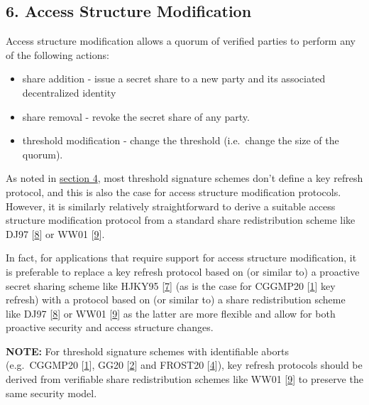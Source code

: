 \documentclass[
]{article}
\providecommand{\tightlist}{%
  \setlength{\itemsep}{0pt}\setlength{\parskip}{0pt}}
\begin{document}
\hypertarget{access-structure-modification}{%
\subsection{6. Access Structure
Modification}\label{access-structure-modification}}

Access structure modification allows a quorum of verified parties to
perform any of the following actions:

\begin{itemize}
\tightlist
\item
  share addition - issue a secret share to a new party and its
  associated decentralized identity
\item
  share removal - revoke the secret share of any party.
\item
  threshold modification - change the threshold (i.e.~change the size of
  the quorum).
\end{itemize}

As noted in \protect\hyperlink{augmentations}{section 4}, most threshold
signature schemes don't define a key refresh protocol, and this is also
the case for access structure modification protocols. However, it is
similarly relatively straightforward to derive a suitable access
structure modification protocol from a standard share redistribution
scheme like DJ97 {[}\protect\hyperlink{ref-dj97}{8}{]} or WW01
{[}\protect\hyperlink{ref-ww01}{9}{]}.

In fact, for applications that require support for access structure
modification, it is preferable to replace a key refresh protocol based
on (or similar to) a proactive secret sharing scheme like HJKY95
{[}\protect\hyperlink{ref-hjky95}{7}{]} (as is the case for CGGMP20
{[}\protect\hyperlink{ref-cggmp20}{1}{]} key refresh) with a protocol
based on (or similar to) a share redistribution scheme like DJ97
{[}\protect\hyperlink{ref-dj97}{8}{]} or WW01
{[}\protect\hyperlink{ref-ww01}{9}{]} as the latter are more flexible
and allow for both proactive security and access structure changes.

\textbf{NOTE:} For threshold signature schemes with identifiable aborts
(e.g.~CGGMP20 {[}\protect\hyperlink{ref-cggmp20}{1}{]}, GG20
{[}\protect\hyperlink{ref-gg20}{2}{]} and FROST20
{[}\protect\hyperlink{ref-frost20}{4}{]}), key refresh protocols should
be derived from verifiable share redistribution schemes like WW01
{[}\protect\hyperlink{ref-ww01}{9}{]} to preserve the same security
model.
\end{document}
